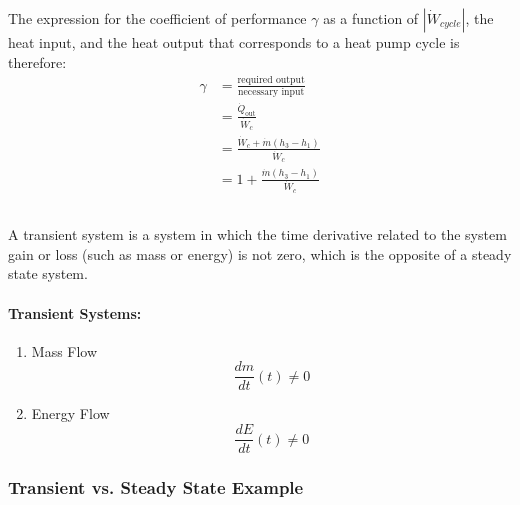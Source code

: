 The expression for the coefficient of performance $\gamma$ as a function of $|\dot{W}_{cycle}|$, the heat input, and the heat output that corresponds to a heat pump cycle is therefore:
\begin{align*}
\gamma &= \frac{\text{required output}}{\text{necessary input}} \\
&= \frac{\dot{Q}_\text{out}}{\dot{W}_c} \\
&= \frac{\dot{W}_c + \dot{m}(h_3-h_1)}{\dot{W}_c} \\
&= 1 + \frac{\dot{m}(h_3-h_1)}{\dot{W}_c}
\end{align*}

\subsection{}
A transient system is a system in which the time derivative related to the system gain or loss (such as mass or energy) is not zero, which is the opposite of a steady state system.
\paragraph{Transient Systems:}
\begin{enumerate}
    \item Mass Flow
    \begin{equation*}
        {\frac{dm}{dt}(t)}\neq 0
    \end{equation*}
    \item Energy Flow
    \begin{equation*}
        {\frac{dE}{dt}(t)}\neq 0
    \end{equation*}
\end{enumerate}

\subsubsection{Transient vs. Steady State Example}

